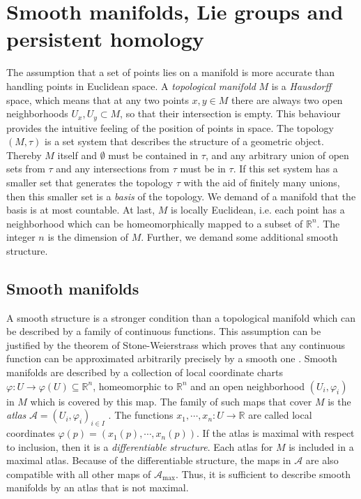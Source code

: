 \documentclass[runningheads,orivec]{llncs}
\begin{document}
\section{Smooth manifolds, Lie groups and persistent homology}
The assumption that a set of points lies on a manifold is more accurate than handling points in Euclidean space. A \emph{topological manifold} $M$ is a \emph{Hausdorff} space, which means that at any two points $x,y \in M$ there are always two open neighborhoods $U_x,U_y \subset M$, so that their intersection is empty. This behaviour provides the intuitive feeling of the position of points in space. The topology $(M, \tau)$ is a set system that describes the structure of a geometric object. Thereby $M$ itself and $\emptyset$ must be contained in $\tau$, and any arbitrary union of open sets from $\tau$ and any intersections from $\tau$ must be in $\tau$. If this set system has a smaller set that generates the topology $\tau$ with the aid of finitely many unions, then this smaller set is a \emph{basis} of the topology. We demand of a manifold that the basis is at most countable. At last, $M$ is locally Euclidean, i.e. each point has a neighborhood which can be homeomorphically mapped to a subset of $\mathbb{R}^n$. The integer $n$ is the dimension of $M$. Further, we demand some additional smooth structure.

\subsection{Smooth manifolds} A smooth structure is a stronger condition than a topological manifold which can be described by a family of continuous functions. This assumption can be justified by the theorem of Stone-Weierstrass which proves that any continuous function can be approximated arbitrarily precisely by a smooth one \cite{stone1948generalized}. Smooth manifolds are described by a collection of local coordinate charts $\varphi: U \rightarrow \varphi(U) \subseteq \mathbb{R}^n$, homeomorphic to $\mathbb{R}^{n}$ and an open neighborhood $(U_i,\varphi_i)$ in $M$ which is covered by this map. The family of such maps that cover $M$ is the \textit{atlas} $\mathscr{A} = (U_i,\varphi_i)_{i \in I}$ \cite{lee2013smooth}. The functions $x_1, \cdots, x_n: U \rightarrow \mathbb{R}$ are called local coordinates $\varphi(p) = (x_1(p), \cdots, x_n(p))$. If the atlas is maximal with respect to inclusion, then it is a \emph{differentiable structure}. Each atlas for $M$ is included in a maximal atlas. Because of the differentiable structure, the maps in $\mathscr{A}$ are also compatible with all other maps of $\mathscr{A}_{\text{max}}$. Thus, it is sufficient to describe smooth manifolds by an atlas that is not maximal.
\end{document}
